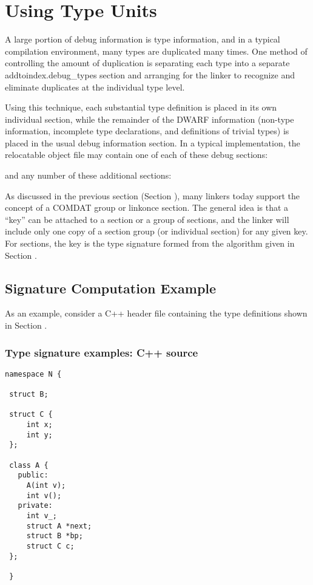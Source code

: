 \section{Using Type Units}
\label{app:usingtypeunits}

A large portion of debug information is type information, and
in a typical compilation environment, many types are duplicated
many times. One method of controlling the amount of duplication
is separating each type into a separate 
addtoindex{.debug\_types} section
and arranging for the linker to recognize and eliminate
duplicates at the individual type level.

Using this technique, each substantial type definition is
placed in its own individual section, while the remainder
of the DWARF information (non-type information, incomplete
type declarations, and definitions of trivial types) is
placed in the usual debug information section. In a typical
implementation, the relocatable object file may contain one
of each of these debug sections:

\begin{alltt}
\end{alltt}

and any number of these additional sections:

\begin{alltt}
\end{alltt}

As discussed in the previous section 
(Section ), 
many
linkers today support the concept of a COMDAT group or
linkonce section. The general idea is that a ``key'' can be
attached to a section or a group of sections, and the linker
will include only one copy of a section group (or individual
section) for any given key. For 
 sections, the
key is the type signature formed from the algorithm given in
Section .

\subsection{Signature Computation Example}
\label{app:signaturecomputationexample}

As an example, consider a C++ header file 
containing the type definitions shown
in Section .

\subsubsection{ Type signature examples: C++ source}
\label{app:typesignatureexamplescsource}
\begin{lstlisting}
namespace N {

 struct B;

 struct C {
     int x;
     int y;
 };

 class A {
   public:
     A(int v);
     int v();
   private:
     int v_;
     struct A *next;
     struct B *bp;
     struct C c;
 };

 }
\end{lstlisting}

